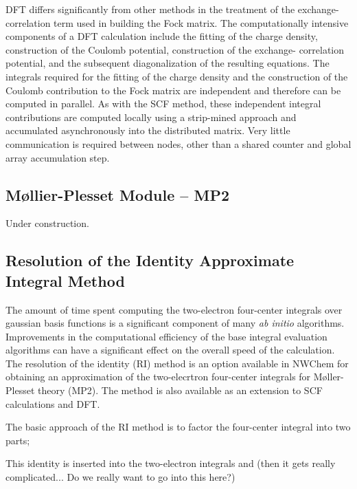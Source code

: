 DFT differs significantly from other methods in the treatment of the
exchange-correlation term used in building the Fock matrix.  The computationally
intensive components of a DFT calculation include the fitting of the charge
density, construction of the Coulomb potential, construction of the exchange-
correlation potential, and the subsequent diagonalization of the resulting
equations.  The integrals required for the fitting of the charge density and 
the construction of
the Coulomb contribution to the Fock matrix are independent and therefore
can be computed in parallel.  As with the SCF method, these independent
integral contributions are computed locally using a strip-mined approach and
accumulated asynchronously into the distributed matrix.  Very little communication
is required between nodes, other than a shared counter and global array accumulation
step.

\subsection{M{\o}llier-Plesset Module -- MP2}

Under construction.

\subsection{Resolution of the Identity Approximate Integral Method}

The amount of time spent computing the two-electron four-center integrals
over gaussian basis functions is a significant component of many {\em ab initio}
algorithms.  Improvements in the computational efficiency of the
base integral evaluation algorithms can have a significant effect on the
overall speed of the calculation.  The resolution of the identity (RI) method
is an option available in NWChem for obtaining an approximation of
the two-elecrtron four-center integrals for M{\o}ller-Plesset theory (MP2).
The method is also available as an extension to SCF calculations and DFT.

The basic approach of the RI method is to factor the four-center integral into
two parts;



This identity is inserted into the two-electron integrals and (then it gets
really complicated... Do we really want to go into this here?)

